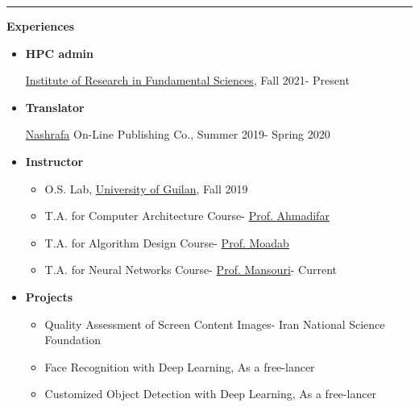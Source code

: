 \documentclass{letter}
\begin{document}
\begin{multicols}{2}
\noindent \rule{\columnwidth}{2pt}

\begin{Large}
	\textbf{Experiences}
\end{Large}
\begin{itemize}
\item \textbf{HPC admin}

\href{https://hpc.ipm.ac.ir/}{Institute of Research in Fundamental Sciences}, Fall 2021- Present

\item \textbf{Translator}

 \href{https://instagram.com/nashrafa}{Nashrafa} On-Line Publishing Co., Summer 2019- Spring 2020

\item \textbf{Instructor}
	\begin{itemize}
		\item O.S. Lab, \href{https://guilan.ac.ir/en/home}{University of Guilan}, Fall 2019

		\item T.A. for Computer Architecture Course- \href{https://scholar.google.com/citations?user=WT1Jve8AAAAJ&hl=en}{Prof. Ahmadifar}

		\item T.A. for Algorithm Design Course- \href{https://www.linkedin.com/in/shahram-moadab-94b79253/?originalSubdomain=ir}{Prof. Moadab}

		\item T.A. for Neural Networks Course- \href{https://scholar.google.com/citations?user=eK03yPgAAAAJ}{Prof. Mansouri}- Current
	\end{itemize}
\item \textbf{Projects}
	\begin{itemize}
		\item Quality Assessment of Screen Content Images- Iran National Science Foundation

		\item Face Recognition with Deep Learning, As a free-lancer

		\item Customized Object Detection with Deep Learning, As a free-lancer
	\end{itemize}
\end{itemize}
% 
% 
\end{multicols}
\end{document}
